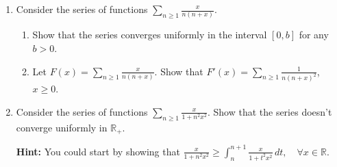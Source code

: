 \documentclass{article}
\begin{document}
\begin{enumerate}
\item Consider the series of functions $\sum_{n\geq 1}^{} \frac{x}{n(n+x)}$.
  \begin{enumerate}
    \item Show that the series converges uniformly in the interval $[0,b]$ for any $b>0$.
    \item Let $F(x)=\sum_{n\geq 1}^{} \frac{x}{n(n+x)}$. Show that $F'(x)=\sum_{n\geq 1}^{} \frac{1}{n(n+x)^2}$, $x\geq 0$.
  \end{enumerate}
\item Consider the series of functions $\sum_{n\geq 1}^{} \frac{x}{1+n^2x^2}$. Show that the series doesn't converge uniformly in $\mathbb{R}_+$.

  \textbf{Hint:} You could start by showing that $\frac{x}{1+n^2x^2}\geq \int_{n}^{n+1} \frac{x}{1+t^2x^2} \, d t, \quad \forall x\in \mathbb{R}$.
\end{enumerate}
\end{document}
